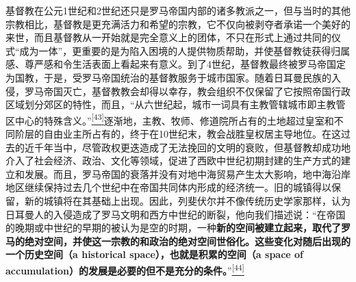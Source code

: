 \documentclass[UTF8, fontset = sourcesans, a4paper, oneside, zihao =
-4, scheme=chinese, no-math, space=true]{ctexbook}
\begin{document}
基督教在公元1世纪和2世纪还只是罗马帝国内部的诸多教派之一，但与当时的其他宗教相比，基督教是更充满活力和希望的宗教，它不仅向被剥夺者承诺一个美好的来世，而且基督教从一开始就是完全意义上的团体，不只在形式上通过共同的仪式``成为一体''，更重要的是为陷入困境的人提供物质帮助，并使基督教徒获得归属感、尊严感和令生活表面上看起来有意义。到了4世纪，基督教最终被罗马帝国定为国教，于是，受罗马帝国统治的基督教服务于城市国家。随着日耳曼民族的入侵，罗马帝国灭亡，基督教教会却得以幸存，教会组织不仅保留了它按照帝国行政区域划分郊区的特性，而且，``从六世纪起，城市一词具有主教管辖城市即主教管区中心的特殊含义。''\protect\hypertarget{part0006_split_003.htmlux5cux23w43}{}{}\protect\hyperlink{part0006_split_003.htmlux5cux23m43}{\textsuperscript{{[}43{]}}}逐渐地，主教、牧师、修道院所占有的土地超过皇室和不同阶层的自由业主所占有的，终于在10世纪末，教会战胜皇权居主导地位。在这过去的近千年当中，尽管政权更迭造成了无法挽回的文明的衰败，但基督教却成功地介入了社会经济、政治、文化等领域，促进了西欧中世纪初期封建的生产方式的建立和发展。而且，罗马帝国的衰落并没有对地中海贸易产生太大影响，地中海沿岸地区继续保持过去几个世纪中在帝国共同体内形成的经济统一。旧的城镇得以保留，新的城镇将在其基础上出现。因此，列斐伏尔并不像传统历史学家那样，认为日耳曼人的入侵造成了罗马文明和西方中世纪的断裂，他向我们描述说：``在帝国的晚期或中世纪的早期的被认为是空的时期，一种\textbf{新的空间被建立起来，取代了罗马的绝对空间，并使这一宗教的和政治的绝对空间世俗化。这些变化对随后出现的一个历史空间（a
historical space），也就是积累的空间（a space of
accumulation）的发展是必要的但不是充分的条件。}''\protect\hypertarget{part0006_split_003.htmlux5cux23w44}{}{}\protect\hyperlink{part0006_split_003.htmlux5cux23m44}{\textsuperscript{{[}44{]}}}
\end{document}
